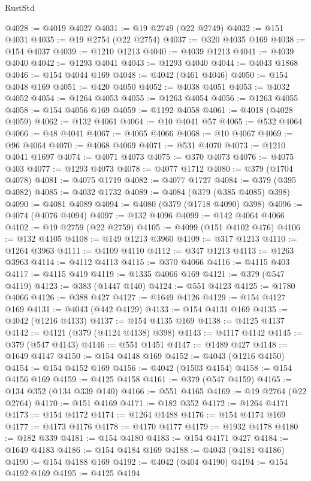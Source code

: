 \begin{lexlean}{RustStd}
\begin{coremodule}
@4028 := @4019 @4027
@4031 := @19 @2749 (@22 @2749)
@4032 := @151 @4031
@4035 := @19 @2754 (@22 @2754)
@4037 := @320 @4035 @169
@4038 := @154 @4037
@4039 := @1210 @1213
@4040 := @4039 @1213
@4041 := @4039 @4040
@4042 := @1293 @4041
@4043 := @1293 @4040
@4044 := @4043 @1868
@4046 := @154 @4044 @169
@4048 := @4042 (@461 @4046)
@4050 := @154 @4048 @169
@4051 := @420 @4050
@4052 := @4038 @4051
@4053 := @4032 @4052
@4054 := @1264 @4053
@4055 := @1263 @4054
@4056 := @1263 @4055
@4058 := @154 @4056 @169
@4059 := @1192 @4058
@4061 := @4018 (@4028 @4059)
@4062 := @132 @4061
@4064 := @10 @4041 @57
@4065 := @532 @4064
@4066 := @48 @4041
@4067 := @4065 @4066
@4068 := @10 @4067
@4069 := @96 @4064
@4070 := @4068 @4069
@4071 := @531 @4070
@4073 := @1210 @4041 @1697
@4074 := @4071 @4073
@4075 := @370 @4073
@4076 := @4075 @403
@4077 := @1293 @4073
@4078 := @4077 @1712
@4080 := @379 (@1704 @4078)
@4081 := @4075 @1719
@4082 := @4077 @1727
@4084 := @379 (@395 @4082)
@4085 := @4032 @1732
@4089 := @4084 (@379 (@385 @4085) @398)
@4090 := @4081 @4089
@4094 := @4080 (@379 (@1718 @4090) @398)
@4096 := @4074 (@4076 @4094)
@4097 := @132 @4096
@4099 := @142 @4064 @4066
@4102 := @19 @2759 (@22 @2759)
@4105 := @4099 (@151 @4102 @476)
@4106 := @132 @4105
@4108 := @149 @1213 @3960
@4109 := @317 @1213
@4110 := @1264 @3963
@4111 := @4109 @4110
@4112 := @347 @1213
@4113 := @1263 @3963
@4114 := @4112 @4113
@4115 := @370 @4066
@4116 := @4115 @403
@4117 := @4115 @419
@4119 := @1335 @4066 @169
@4121 := @379 (@547 @4119)
@4123 := @383 (@1447 @140)
@4124 := @551 @4123
@4125 := @1780 @4066
@4126 := @388 @427
@4127 := @1649 @4126
@4129 := @154 @4127 @169
@4131 := @4043 (@442 @4129)
@4133 := @154 @4131 @169
@4135 := @4042 (@1216 @4133)
@4137 := @154 @4135 @169
@4138 := @4125 @4137
@4142 := @4121 (@379 (@4124 @4138) @398)
@4143 := @4117 @4142
@4145 := @379 (@547 @4143)
@4146 := @551 @1451
@4147 := @1489 @427
@4148 := @1649 @4147
@4150 := @154 @4148 @169
@4152 := @4043 (@1216 @4150)
@4154 := @154 @4152 @169
@4156 := @4042 (@1503 @4154)
@4158 := @154 @4156 @169
@4159 := @4125 @4158
@4161 := @379 (@547 @4159)
@4165 := @134 @352 (@134 @339 @140)
@4166 := @551 @4165
@4169 := @19 @2764 (@22 @2764)
@4170 := @151 @4169
@4171 := @182 @352
@4172 := @1264 @4171
@4173 := @154 @4172
@4174 := @1264 @1488
@4176 := @154 @4174 @169
@4177 := @4173 @4176
@4178 := @4170 @4177
@4179 := @1932 @4178
@4180 := @182 @339
@4181 := @154 @4180
@4183 := @154 @4171 @427
@4184 := @1649 @4183
@4186 := @154 @4184 @169
@4188 := @4043 (@4181 @4186)
@4190 := @154 @4188 @169
@4192 := @4042 (@404 @4190)
@4194 := @154 @4192 @169
@4195 := @4125 @4194

\end{coremodule}
\end{lexlean}
